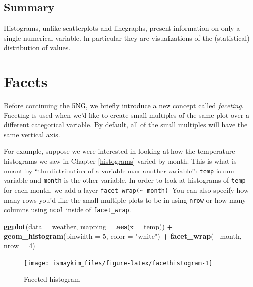 \documentclass[12pt,]{krantz}
\makeatletter
\newenvironment{Shaded}{\begin{snugshade}}{\end{snugshade}}
\newcommand{\KeywordTok}[1]{\textcolor[rgb]{0.27,0.27,0.27}{\textbf{#1}}}
\newcommand{\DataTypeTok}[1]{\textcolor[rgb]{0.27,0.27,0.27}{#1}}
\newcommand{\DecValTok}[1]{\textcolor[rgb]{0.06,0.06,0.06}{#1}}
\newcommand{\StringTok}[1]{\textcolor[rgb]{0.5,0.5,0.5}{#1}}
\newcommand{\OperatorTok}[1]{\textcolor[rgb]{0.43,0.43,0.43}{\textbf{#1}}}
\newcommand{\NormalTok}[1]{#1}
\newenvironment{kframe}{%
\medskip{}
\setlength{\fboxsep}{.8em}
 \def\at@end@of@kframe{}%
 \ifinner\ifhmode%
  \def\at@end@of@kframe{\end{minipage}}%
  \begin{minipage}{\columnwidth}%
 \fi\fi%
 \def\FrameCommand##1{\hskip\@totalleftmargin \hskip-\fboxsep
 \colorbox{shadecolor}{##1}\hskip-\fboxsep
     \hskip-\linewidth \hskip-\@totalleftmargin \hskip\columnwidth}%
 \MakeFramed {\advance\hsize-\width
   \@totalleftmargin\z@ \linewidth\hsize
   \@setminipage}}%
 {\par\unskip\endMakeFramed%
 \at@end@of@kframe}
\renewenvironment{Shaded}{\begin{kframe}}{\end{kframe}}
\theoremstyle{definition}
\theoremstyle{definition}
\theoremstyle{definition}
\theoremstyle{remark}
\makeatother
\begin{document}
\subsection{Summary}\label{summary-2}

Histograms, unlike scatterplots and linegraphs, present information on
only a single numerical variable. In particular they are visualizations
of the (statistical) distribution of values.

\section{Facets}\label{facets}

Before continuing the 5NG, we briefly introduce a new concept called
\emph{faceting}. Faceting is used when we'd like to create small
multiples of the same plot over a different categorical variable. By
default, all of the small multiples will have the same vertical axis.

For example, suppose we were interested in looking at how the
temperature histograms we saw in Chapter \ref{histograms} varied by
month. This is what is meant by ``the distribution of a variable over
another variable'': \texttt{temp} is one variable and \texttt{month} is
the other variable. In order to look at histograms of \texttt{temp} for
each month, we add a layer
\texttt{facet\_wrap(\textasciitilde{}\ month)}. You can also specify how
many rows you'd like the small multiple plots to be in using
\texttt{nrow} or how many columns using \texttt{ncol} inside of
\texttt{facet\_wrap}.

\begin{Shaded}
\begin{Highlighting}[]
\KeywordTok{ggplot}\NormalTok{(}\DataTypeTok{data =}\NormalTok{ weather, }\DataTypeTok{mapping =} \KeywordTok{aes}\NormalTok{(}\DataTypeTok{x =}\NormalTok{ temp)) }\OperatorTok{+}
\StringTok{  }\KeywordTok{geom_histogram}\NormalTok{(}\DataTypeTok{binwidth =} \DecValTok{5}\NormalTok{, }\DataTypeTok{color =} \StringTok{"white"}\NormalTok{) }\OperatorTok{+}
\StringTok{  }\KeywordTok{facet_wrap}\NormalTok{(}\OperatorTok{~}\StringTok{ }\NormalTok{month, }\DataTypeTok{nrow =} \DecValTok{4}\NormalTok{)}
\end{Highlighting}
\end{Shaded}

\begin{figure}

{\centering \texttt{[image: ismaykim\_files/figure-latex/facethistogram-1]} 

}

\caption{Faceted histogram}\label{fig:facethistogram}
\end{figure}
\end{document}
